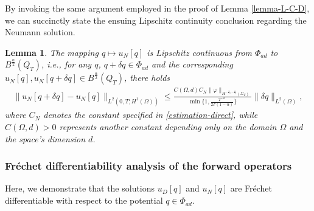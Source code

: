 \documentclass[a4paper,12pt,reqno,natbib]{amsart}
\newtheorem{lemma}[theorem]{Lemma}
\begin{document}
By invoking the same argument employed in the proof of Lemma \ref{lemma-L-C-D}, we can succinctly state the ensuing Lipschitz continuity conclusion regarding the Neumann solution.

\begin{lemma} \label{lipshitz}
The mapping $q\longmapsto u_N[q]$ is Lipschitz continuous from $\Phi_{ad}$ to $B^{\frac{\alpha}{2}}(Q_T)$, i.e., for any $q$, $q+\delta q \in \Phi_{ad}$ and the corresponding $u_N[q], u_N[q+\delta q] \in B^{\frac{\alpha}{2}}(Q_T)$, there holds
\begin{align} \label{lip_N}
     \|u_N[q+\delta q]-u_N[q]\|_{L^2(0,T;H^1(\Omega))}\leq \frac{C(\Omega,d)C_N\|\varphi\|_{H^{-\frac{1}{2}, -\frac{\alpha}{4} }(\Sigma_T)}}{\min\{1,\frac{T^{-\alpha}}{2\Gamma(1-\alpha)}\}} \| \delta q \|_{L^2(\Omega)},
\end{align}
where $C_N$ denotes the constant specified in \eqref{estimation-direct}, while $C(\Omega,d)>0$ represents another constant depending only on the domain $\Omega$ and the space's dimension $d$.
\end{lemma}



\subsubsection{\bf Fr\'echet differentiability analysis of the forward operators}

Here, we demonstrate that the solutions $u_D[q]$ and $u_N[q]$ are Fr\'echet differentiable with respect to the potential $q\in \Phi_{ad}.$
\end{document}
